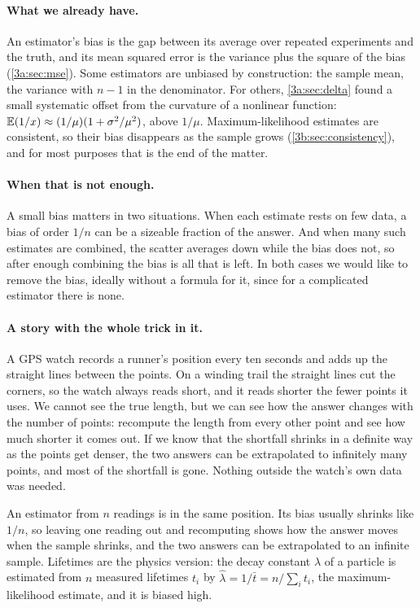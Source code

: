 \paragraph{What we already have.}
An estimator's bias is the gap between its average over repeated
experiments and the truth, and its mean squared error is the variance plus
the square of the bias (\cref{3a:sec:mse}). Some estimators are unbiased by
construction: the sample mean, the variance with $n-1$ in the denominator.
For others, \cref{3a:sec:delta} found a small systematic offset from the
curvature of a nonlinear function: $\E(1/x)\approx(1/\mu)(1+\sigma^2/\mu^2)$, above
$1/\mu$. Maximum-likelihood estimates are consistent, so their bias
disappears as the sample grows (\cref{3b:sec:consistency}), and for most
purposes that is the end of the matter.

\paragraph{When that is not enough.}
A small bias matters in two situations. When each estimate rests on few data,
a bias of order $1/n$ can be a sizeable fraction of the answer. And when
many such estimates are combined, the scatter averages down while the bias
does not, so after enough combining the bias is all that is left. In both
cases we would like to remove the bias, ideally without a formula for it,
since for a complicated estimator there is none.

\paragraph{A story with the whole trick in it.}
A GPS watch records a runner's position every ten seconds and adds up the
straight lines between the points. On a winding trail the straight lines cut
the corners, so the watch always reads short, and it reads shorter the
fewer points it uses. We cannot see the true length, but we can see how the
answer changes with the number of points: recompute the length from every
other point and see how much shorter it comes out. If we know that the
shortfall shrinks in a definite way as the points get denser, the two
answers can be extrapolated to infinitely many points, and most of the
shortfall is gone. Nothing outside the watch's own data was needed.

An estimator from $n$ readings is in the same position. Its bias usually
shrinks like $1/n$, so leaving one reading out and recomputing shows how the
answer moves when the sample shrinks, and the two answers can be
extrapolated to an infinite sample. Lifetimes are the physics version:
the decay constant $\lambda$ of a particle is estimated from $n$ measured
lifetimes $t_i$ by $\hat\lambda=1/\bar t=n/\sum_it_i$, the maximum-likelihood
estimate, and it is biased high.

